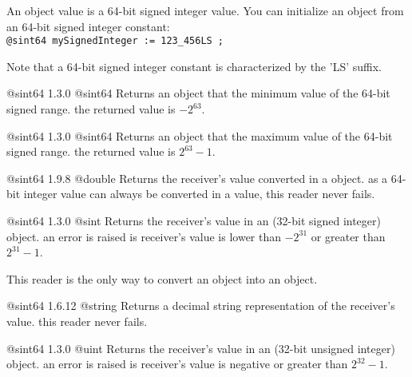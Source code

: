 
An  object value is a 64-bit signed integer value. You can initialize an  object from an 64-bit signed integer constant:\\

\texttt{@sint64 mySignedInteger := 123\_456LS ;}

Note that a 64-bit signed integer constant is characterized by the 'LS' suffix.




{@sint64}
{1.3.0}
{@sint64}
{Returns an  object that the minimum value of the 64-bit signed range.}
{the returned value is $-2^{63}$.}





{@sint64}
{1.3.0}
{@sint64}
{Returns an  object that the maximum value of the 64-bit signed range.}
{the returned value is $2^{63}-1$.}





{@sint64}
{1.9.8}
{@double}
{Returns the receiver's value converted in a  object.}
{as a 64-bit integer value can always be converted in a  value, this reader never fails.}




{@sint64}
{1.3.0}
{@sint}
{Returns the receiver's value in an  (32-bit signed integer) object.}
{an error is raised is receiver's value is lower than $-2^{31}$ or greater than $2^{31}-1$.}

This reader is the only way to convert an  object into an  object.





{@sint64}
{1.6.12}
{@string}
{Returns a decimal string representation of the receiver's value.}
{this reader never fails.}








{@sint64}
{1.3.0}
{@uint}
{Returns the receiver's value in an  (32-bit unsigned integer) object.}
{an error is raised is receiver's value is negative or greater than $2^{32}-1$.}

